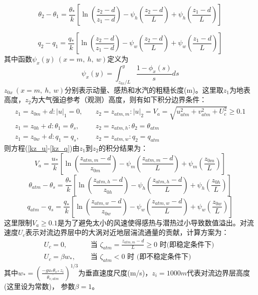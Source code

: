 \begin{equation}
\theta_{2}-\theta_{1}=\frac{\theta_{*}}{k}\left[\ln \left(\frac{z_{2}-d}{z_{1}-d}\right)-\psi_{h}\left(\frac{z_{2}-d}{L}\right)+\psi_{h}\left(\frac{z_{1}-d}{L}\right)\right]
\end{equation}

\begin{equation}
q_{2}-q_{1}=\frac{q_{*}}{k}\left[\ln \left(\frac{z_{2}-d}{z_{1}-d}\right)-\psi_{w}\left(\frac{z_{2}-d}{L}\right)+\psi_{w}\left(\frac{z_{1}-d}{L}\right)\right]
\end{equation}
其中函数$\psi_x\left(y\right)\ (x=m,\ h,\ w)$定义为
\begin{equation}
\psi_{x}(y)=\int_{{z_{0x}}/{L}}^{y} \frac{1-\phi_{x}(s)}{s} d s
\end{equation}
$z_{0x}\ (x=m,\ h,\ w)$分别表示动量、感热和水汽的粗糙长度(m)。这里取$z_1$为地表高度，$z_2$为大气强迫参考（观测）高度，则有如下积分边界条件：
\begin{equation}\label{VaIni}
\begin{array}{ll}z_{1}=z_{0 m}+d:|u|_{1}=0, \quad & z_{2}=z_{atm, m}: |u|_{2}=V_{a}=\sqrt{u_{atm}^{2}+v_{atm}^{2}+U_{c}^{2}} \geq 0.1 \\ 
     z_{1}=z_{0 h}+d: \theta_{1}=\theta_{s}, & z_{2}=z_{atm, h}: \theta_{2}=\theta_{atm} \\ 
     z_{1}=z_{0 w}+d: q_{1}=q_{s}, & z_{2}=z_{atm, w}: q_{2}=q_{atm}\end{array}
\end{equation}
则方程(\ref{kz_u}-\ref{kz_q})由$z_1$到$z_2$的积分结果为：
\begin{equation}\label{Va}
V_{a}=\frac{u_{*}}{k}\left[\ln \left(\frac{z_{atm, m}-d}{z_{0 m}}\right)-\psi_{m}\left(\frac{z_{atm, m}-d}{L}\right)+\psi_{m}\left(\frac{z_{0 m}}{L}\right)\right]
\end{equation}
\begin{equation}\label{theta_atm-theta_s}
\theta_{atm}-\theta_{s}=\frac{\theta_{*}}{k}\left[\ln \left(\frac{z_{atm, h}-d}{z_{0 h}}\right)-\psi_{h}\left(\frac{z_{atm, h}-d}{L}\right)+\psi_{h}\left(\frac{z_{0 h}}{L}\right)\right]
\end{equation}
\begin{equation}\label{q_atm-qs}
q_{atm}-q_{s}=\frac{q_{*}}{k}\left[\ln \left(\frac{z_{atm, w}-d}{z_{0 w}}\right)-\psi_{w}\left(\frac{z_{atm, w}-d}{L}\right)+\psi_{w}\left(\frac{z_{0 w}}{L}\right)\right]
\end{equation}
这里限制$V_a\geq0.1$是为了避免太小的风速使得感热与潜热过小导致数值溢出。对流速度$U_c$表示对流边界层中的大涡对近地层湍流通量的贡献，计算方案为：
\begin{equation}
\begin{array}{ll} U_{c}=0, \quad & \text { 当 } \zeta_{atm}=\frac{z_{atm, m}-d}{L} \geq 0 \text { 时(即稳定条件下) } \\
       U_{c}=\beta w_{*}, \quad & \text { 当 } \zeta_{atm}<0 \text { 时 (即不稳定条件下) }\end{array}
\end{equation}
其中$w_\ast={(\frac{-gu_\ast\theta_{v\ast}z_i}{\bar{\theta_{v,atm}}})}^{1/3}$为垂直速度尺度(m/s)，$z_i=1000m$代表对流边界层高度(这里设为常数)，
参数$\beta=1$。

